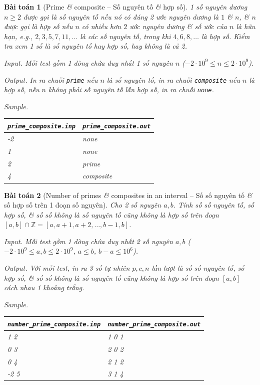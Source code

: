 \documentclass{article}
\newtheorem{baitoan}{Bài toán}
\begin{document}
\begin{baitoan}[Prime {\it\&} composite -- Số nguyên tố {\it\&} hợp số]
	1 số nguyên dương $n\ge2$ được gọi là {\rm số nguyên tố} nếu nó có đúng 2 ước nguyên dương là $1$ {\it\&} $n$, {\it\&} $n$ được gọi là {\rm hợp số} nếu $n$ có nhiều hơn $2$ ước nguyên dương {\it\&} số ước của $n$ là hữu hạn, e.g., $2,3,5,7,11,\ldots$ là các số nguyên tố, trong khi $4,6,8,\ldots$ là hợp số. Kiểm tra xem 1 số là số nguyên tố hay hợp số, hay không là cả 2.
	\item {\sf Input.} Mỗi test gồm 1 dòng chứa duy nhất 1 số nguyên $n$ ($-2\cdot10^9\le n\le2\cdot10^9$).
	\item {\sf Output.} In ra chuỗi {\tt prime} nếu $n$ là số nguyên tố, in ra chuỗi {\tt composite} nếu $n$ là hợp số, nếu $n$ không phải số nguyên tố lẫn hợp số, in ra chuỗi {\tt none}.
	\item {\sf Sample.}
	\begin{table}[H]
		\centering
		\begin{tabular}{|l|l|}
			\hline
			\verb|prime_composite.inp| & \verb|prime_composite.out| \\
			\hline
			-2 & none\\
			\hline
			1 & none\\
			\hline
			2 & prime \\
			\hline
			4 & composite\\
			\hline
		\end{tabular}
	\end{table}
\end{baitoan}

\begin{baitoan}[Number of primes {\it\&} composites in an interval -- Số số nguyên tố {\it\&} số hợp số trên 1 đoạn số nguyên]
	Cho 2 số nguyên $a,b$. Tính số số nguyên tố, số hợp số, {\it\&} số số không là số nguyên tố cũng không là hợp số trên đoạn $[a,b]\cap\mathbb{Z} = [a,a + 1,a + 2,\ldots,b - 1, b]$.
	\item {\sf Input.} Mỗi test gồm 1 dòng chứa duy nhất 2 số nguyên $a,b$ ($-2\cdot10^9\le a,b\le2\cdot10^9$, $a\le b$, $b - a\le10^6$).
	\item {\sf Output.} Với mỗi test, in ra 3 số tự nhiên $p,c,n$ lần lượt là số số nguyên tố, số hợp số, {\it\&} số số không là số nguyên tố cũng không là hợp số trên đoạn $[a,b]$ cách nhau 1 khoảng trắng.
	\item {\sf Sample.}
	\begin{table}[H]
		\centering
		\begin{tabular}{|l|l|}
			\hline
			\verb|number_prime_composite.inp| & \verb|number_prime_composite.out| \\
			\hline
			1 2 & 1 0 1\\
			\hline
			0 3 & 2 0 2\\
			\hline
			0 4 & 2 1 2\\
			\hline
			-2 5 & 3 1 4\\
			\hline
		\end{tabular}
	\end{table}
\end{baitoan}
\end{document}
